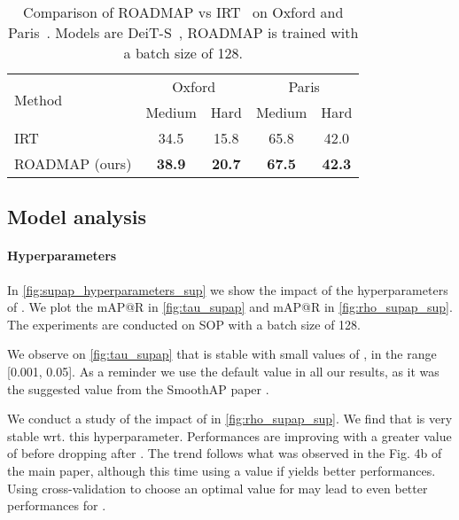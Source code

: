 \begin{table}[h!]
    \caption{Comparison of ROADMAP vs IRT~\cite{transformer_ir} on Oxford and Paris~\cite{Radenovic-CVPR18}. Models are DeiT-S~\cite{deit}, ROADMAP is trained with a batch size of 128.}
    \label{tab:landmark_retrieval}
    \centering
    \begin{tabular}{ l cc cc }
        \toprule
         \multirow{2}{*}{Method}& \multicolumn{2}{c}{Oxford} &\multicolumn{2}{c}{Paris}\\
         & Medium & Hard & Medium & Hard \\
         \midrule
         IRT~\cite{transformer_ir} & 34.5 & 15.8 & 65.8 & 42.0 \\
         ROADMAP (ours) & \textbf{38.9} & \textbf{20.7} & \textbf{67.5} & \textbf{42.3} \\
         \bottomrule
    \end{tabular}
\end{table}




\subsection{Model analysis}

\paragraph{Hyperparameters}

In \cref{fig:supap_hyperparameters_sup} we show the impact of the hyperparameters of . We plot the mAP@R \vs  in \cref{fig:tau_supap} and mAP@R \vs  in \cref{fig:rho_supap_sup}. The experiments are conducted on SOP with a batch size of 128. 

We observe on \cref{fig:tau_supap} that  is stable with small values of , \ie in the range [0.001, 0.05]. As a reminder we use the default value  in all our results, as it was the suggested value from the SmoothAP paper \cite{smoothap}.



We conduct a study of the impact of  in \cref{fig:rho_supap_sup}. We find that  is very stable wrt. this hyperparameter. Performances are improving with a greater value of  before dropping after . The trend follows what was observed in the Fig. 4b of the main paper, although this time using a value if  yields better performances. Using cross-validation to choose an optimal value for  may lead to even better performances for .

